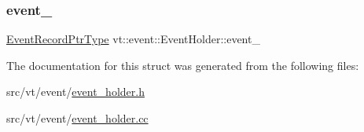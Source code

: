 \mbox{\label{structvt_1_1event_1_1_event_holder_a62cebec55c3a8a4a54423d11504fb4ea}} 
\subsubsection{\texorpdfstring{event\+\_\+}{event\_}}
{\footnotesize\ttfamily \hyperlink{structvt_1_1event_1_1_event_holder_a89949c85549018aad229356105187d50}{Event\+Record\+Ptr\+Type} vt\+::event\+::\+Event\+Holder\+::event\+\_\+\hspace{0.3cm}{\ttfamily [private]}}



The documentation for this struct was generated from the following files\+:\begin{DoxyCompactItemize}
\item 
src/vt/event/\hyperlink{event__holder_8h}{event\+\_\+holder.\+h}\item 
src/vt/event/\hyperlink{event__holder_8cc}{event\+\_\+holder.\+cc}\end{DoxyCompactItemize}
